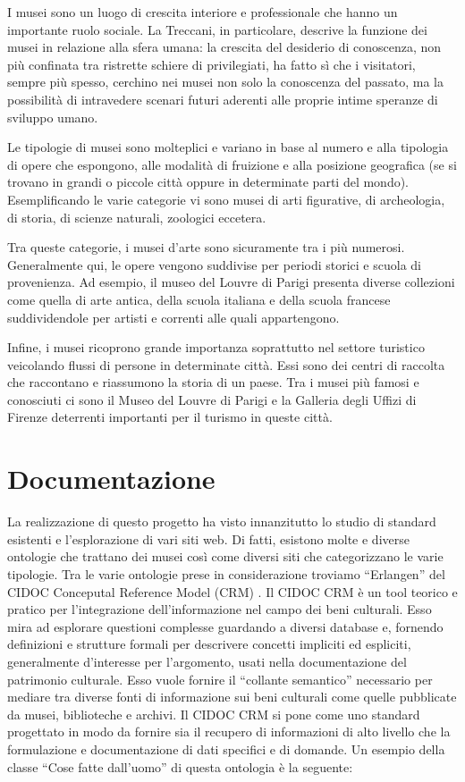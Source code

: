 \documentclass[12pt]{article}
\begin{document}
I musei sono un luogo di crescita interiore e professionale che hanno un importante ruolo sociale. La Treccani, in particolare, descrive la funzione dei musei in relazione alla sfera umana: la crescita del desiderio di conoscenza, non più confinata tra ristrette schiere di privilegiati, ha fatto sì che i visitatori, sempre più spesso, cerchino nei musei non solo la conoscenza del passato, ma la possibilità di intravedere scenari futuri aderenti alle proprie intime speranze di sviluppo umano. \parencite{def2}

Le tipologie di musei sono molteplici e variano in base al numero e alla tipologia di opere che espongono, alle modalità di fruizione e alla posizione geografica (se si trovano in grandi o piccole città oppure in determinate parti del mondo).
Esemplificando le varie categorie vi sono musei di arti figurative, di archeologia, di storia, di scienze naturali, zoologici eccetera.

Tra queste categorie, i musei d’arte sono sicuramente tra i più numerosi. Generalmente qui, le opere vengono suddivise per periodi storici e scuola di provenienza. Ad esempio, il museo del Louvre di Parigi presenta diverse collezioni come quella di arte antica, della scuola italiana e della scuola francese suddividendole per artisti e correnti alle quali appartengono. \parencite{louvre}

Infine, i musei ricoprono grande importanza soprattutto nel settore turistico veicolando flussi di persone in determinate città. Essi sono dei centri di raccolta che raccontano e riassumono la storia di un paese. Tra i musei più famosi e conosciuti ci sono il Museo del Louvre di Parigi e la Galleria degli Uffizi di Firenze deterrenti importanti per il turismo in queste città.
\newpage
\section{Documentazione}
La realizzazione di questo progetto ha visto innanzitutto lo studio di standard esistenti e l’esplorazione di vari siti web. Di fatti, esistono molte e diverse ontologie che trattano dei musei così come diversi siti che categorizzano le varie tipologie. 
Tra le varie ontologie prese in considerazione troviamo “Erlangen” del CIDOC Conceputal Reference Model (CRM) \parencite{cidoc}. Il CIDOC CRM è un tool teorico e pratico per l’integrazione dell’informazione nel campo dei beni culturali. Esso mira ad esplorare questioni complesse guardando a diversi database e, fornendo definizioni e strutture formali per descrivere concetti impliciti ed espliciti, generalmente d’interesse per l’argomento, usati nella documentazione del patrimonio culturale. Esso vuole fornire il “collante semantico” necessario per mediare tra diverse fonti di informazione sui beni culturali come quelle pubblicate da musei, biblioteche e archivi.
 Il CIDOC CRM si pone come uno standard progettato in modo da fornire sia il recupero di informazioni di alto livello che la formulazione e documentazione di dati specifici e di domande.
Un esempio della classe “Cose fatte dall’uomo” di questa ontologia è la seguente: 
\end{document}
